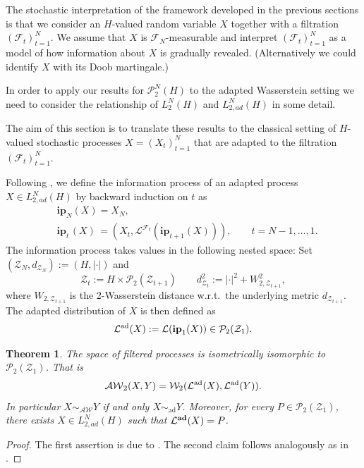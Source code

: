 \documentclass[a4paper]{amsart}
\newtheorem{theorem}{Theorem}
\numberwithin{theorem}{section}
\theoremstyle{definition}
\newcommand{\F}{\mathcal{F}}
\newcommand{\law}{\mathcal{L}}
\newcommand{\W}{\mathcal{W}}
\newcommand{\AW}{\mathcal{AW}}
\newcommand{\Pc}{\mathcal P}
\newcommand{\simad}{\sim_{\mathrm{ad}}}
\renewcommand{\H}{H}
\newcommand{\lawad}{\law^{\textup{ad}}}
\newcommand{\Zc}{\mathcal{Z}}
\newcommand{\ipp}{\mathbf{ip}}
\newcommand{\lawadd}{\law^{\textnormal{\textbf{ad}}}}
\begin{document}
The stochastic interpretation of the framework developed in the previous sections is that we consider an $\H$-valued random variable  
$X$ together with a filtration $(\F_t)_{t=1}^N$. We assume that $X$ is $\F_N$-measurable and interpret $(\F_t)_{t=1}^N$ as a model of how information about $X$ is gradually revealed. (Alternatively we could identify $X$ with its Doob martingale.)

In order to apply our results for $\Pc_2^N(H)$ to the adapted Wasserstein setting we need to consider the relationship  of  $L_2^N(H)$ and $L_{2,ad}^N(H)$ in some detail. 

\medskip
 
 The aim of this section is to translate these results to the classical setting of $H$-valued stochastic processes $X=(X_t)_{t=1}^N$ that are adapted to the filtration $(\F_t)_{t=1}^N$.

Following \cite{BaBePa21},  we  define the information process of an adapted process $X \in L_{2,ad}^N(\H)$ by backward induction on $t$ as
\begin{align*}
&\ipp_N(X) = X_N, \\
&\ipp_{t\,}(X) \,= (X_t, \law^{\F_t}(\ipp_{t+1}(X))), \qquad t = N-1,\dots,1.
\end{align*}
The information process takes values in the following nested space: Set $(\Zc_N, d_{\Zc_N}) := (\H, | \cdot |)$ and 
\[
\Zc_t := \H \times \Pc_2(\Zc_{t+1}) \qquad d_{\Zc_t}^2 := | \cdot |^2 + W_{2,\Zc_{t+1}}^2, 
\]
where $W_{2,\Zc_{t+1}}$ is the 2-Wasserstein distance w.r.t.\ the underlying metric $d_{\Zc_{t+1}}$. 
The adapted distribution of $X$ is then defined as 
\begin{align}\label{eq:last_lawad}
\lawad(X) := \law(\ipp_1(X)) \in \Pc_2(\Zc_1).
\end{align}


\begin{theorem}\label{thm:FPisometry}
The space of filtered processes is isometrically isomorphic to $\Pc_2(\Zc_1)$. That is
\[
\AW_2(X,Y) = \W_2(\lawad(X), \lawad(Y)).
\]
In particular $X\sim_\AW Y $ if and only  $X\simad Y $.
Moreover, for every $P \in \Pc_2(\Zc_1)$, there exists $X \in L_{2,ad}^N(H)$ such that $\lawadd(X)=P$. 
\end{theorem}
\begin{proof}
    The first assertion is due to \cite[Theorem 1.3]{BaBePa21}.
    The second claim follows analogously as in .
\end{proof}
\end{document}
